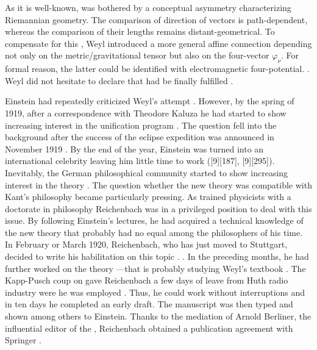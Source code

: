 \documentclass[draft]{article}
\newcommand{\phin}{\ensuremath{\varphi_\nu}\xspace}
\begin{document}
As it is well-known, \citet{Weyl1918a,Weyl1919a} was bothered by a conceptual asymmetry characterizing Riemannian geometry. The comparison of direction of vectors is path-dependent, whereas the comparison of their lengths remains distant-geometrical. To compensate for this   \citep{Afriat2009}, Weyl introduced a more general affine connection depending not only on the metric/gravitational tensor \gmn but also on the four-vector \phin. For formal reason, the latter could be identified with electromagnetic four-potential. . Weyl did not hesitate to declare that  had be finally fulfilled \citep[263]{Weyl1919}.

Einstein had repeatedly criticized Weyl's attempt \citep{Einstein1918b}. However, by the spring of 1919, after a correspondence with Theodore Kaluza he had started to show increasing interest in the unification program \citep{Wuensch2005}. The question fell into the background after the success of the eclipse expedition was announced in November 1919 \citep{Dyson1920}. By the end of the year, Einstein was turned into an international celebrity leaving him little time to work ([9][187], [9][295]). Inevitably, the German philosophical community started to show increasing interest in the theory \citep[see][for an overview]{Hentschel1990a}. The question whether the new theory was compatible with Kant's philosophy became particularly pressing. As trained physicists with a doctorate in philosophy \cite{Reichenbach1916} Reichenbach was in a privileged position to deal with this issue. By following Einstein's lectures, he had acquired a technical knowledge of the new theory that probably had no equal among the philosophers of his time. In February or March 1920, Reichenbach, who has just moved to Stuttgart, decided to write his habilitation on this topic . . In the preceding months, he had further worked on the theory  \citep[044-06-23]{HR}---that is probably studying Weyl's textbook  \citep{Weyl1918}. The Kapp-Pusch coup on  gave Reichenbach a few days of leave from Huth radio industry were he was employed \citep[044-06-23]{HR}. Thus, he could work without interruptions and in ten days he completed an early draft. The manuscript was then typed and shown among others to Einstein. Thanks to the mediation of Arnold Berliner, the influential editor of the , Reichenbach obtained a publication agreement with Springer \citep[044-06-23]{HR}.
\end{document}
